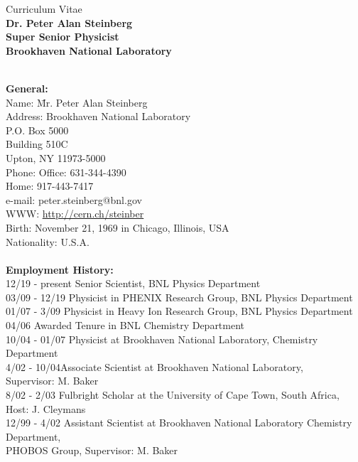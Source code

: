 \documentclass[11 pt]{article}
\begin{document}
\newcommand{\snn}{\sqrt{s_{NN}}}
\begin{center}
Curriculum Vitae \\
{\bf Dr. Peter Alan Steinberg}\\
{\bf Super Senior Physicist}\\
{\bf Brookhaven National Laboratory}\\
\end{center}

\begin{tabbing}
\\
{\bf General:}\\
Name: \hspace{2cm} \= Mr. Peter Alan Steinberg \\
Address: \> Brookhaven National Laboratory\\  
        \> P.O. Box 5000\\
        \> Building 510C \\
        \> Upton, NY 11973-5000 \\
Phone: \> Office: 631-344-4390 \\
       \> Home:   917-443-7417\\
e-mail: \> peter.steinberg@bnl.gov \\
WWW: \> \url{http://cern.ch/steinber} \\
Birth: \> November 21, 1969 in Chicago, Illinois, USA \\
Nationality: \> U.S.A. \\
\\
\textbf{Employment History:}\\
12/19 - present \> Senior Scientist, BNL Physics Department\\
03/09 - 12/19 \> Physicist in PHENIX Research Group, BNL Physics Department  \\
01/07 - 3/09 \> Physicist in Heavy Ion Research Group, BNL Physics Department  \\
04/06 \> Awarded Tenure in BNL Chemistry Department\\
10/04 - 01/07 \>Physicist at Brookhaven National Laboratory, Chemistry Department\\
4/02 - 10/04\>Associate Scientist at Brookhaven National Laboratory,\\ \> Supervisor: M. Baker\\
8/02 - 2/03\> Fulbright Scholar at the University of Cape Town, South Africa, Host: J. Cleymans\\
12/99 - 4/02 \>Assistant Scientist at Brookhaven National Laboratory Chemistry Department,\\ \> PHOBOS Group, Supervisor: M. Baker\\

\end{tabbing}
\end{document}
